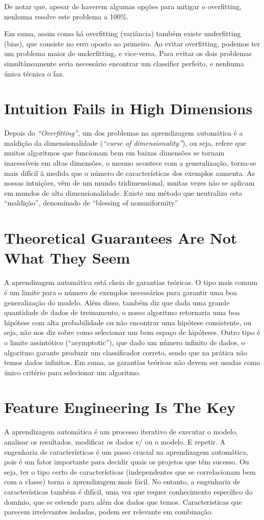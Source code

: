 \documentclass{article}
\begin{document}
De notar que, apesar de haverem algumas opções para mitigar o overfitting, nenhuma resolve este problema a 100\%.

Em suma, assim como há overfitting (variância) também existe underfitting (bias), que consiste no erro oposto ao primeiro.
Ao evitar overfitting, podemos ter um problema maior de underfitting, e vice-versa. Para evitar os dois problemas simultâneamente seria necessário encontrar um classifier perfeito, e nenhuma única técnica o faz.

\section{Intuition Fails in High Dimensions}
Depois do \emph{“Overfitting”}, um dos problemas na aprendizagem automática é a maldição da dimensionalidade (\emph{“curse of dimensionality”}), ou seja, refere que muitos algoritmos que funcionam bem em baixas dimensões se tornam inacessíveis em altas dimensões, o mesmo acontece com a generalização, torna-se mais difícil à medida que o número de características dos exemplos aumenta. 
As nossas intuições, vêm de um mundo tridimensional, muitas vezes não se aplicam em mundos de alta dimensionalidade. Existe um método que neutraliza esta “maldição”, denominado de “blessing of nonuniformity”

\section{Theoretical Guarantees Are Not What They Seem}
A aprendizagem automática está cheia de garantias teóricas.
O tipo mais comum é um limite para o número de exemplos necessários para garantir uma boa generalização do modelo. Além disso, também diz que dada uma grande quantidade de dados de treinamento, o nosso algoritmo retornaria uma boa hipótese com alta probabilidade ou não encontrar uma hipótese consistente, ou seja, não nos diz sobre como selecionar um bom espaço de hipóteses.
Outro tipo é o limite assintótico (“asymptotic”), que dado um número infinito de dados, o algoritmo garante produzir um classificador correto, sendo que na prática não temos dados infinitos.
Em suma, as garantias teóricas não devem ser usadas como único critério para selecionar um algoritmo.

\section{Feature Engineering Is The Key}
A aprendizagem automática é um processo iterativo de executar o modelo, analisar os
resultados, modificar os dados e/ ou o modelo. E repetir.
A engenharia de características é um passo crucial na aprendizagem automática, pois é um
fator importante para decidir quais os projetos que têm sucesso. Ou seja, ter o tipo certo de
características (independentes que se correlacionam bem com a classe) torna a aprendizagem
mais fácil. No entanto, a engenharia de características também é difícil, uma vez que requer
conhecimento específico do domínio, que se estende para além dos dados que temos. Características que parecem irrelevantes isoladas, podem ser relevante em combinação.
\end{document}
